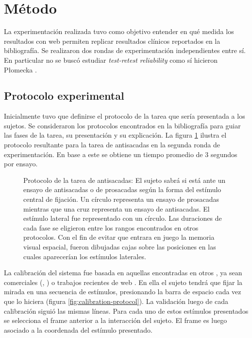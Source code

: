 \section{Método}

La experimentación realizada tuvo como objetivo entender en qué medida los
resultados con \eyetracking web permiten replicar resultados clínicos
reportados en la bibliografía.
Se realizaron dos rondas de experimentación independientes entre sí.
En particular no se buscó estudiar \textit{test-retest reliability} como sí
hicieron P{\l}omecka \etal \cite{plomecka_2020_retest_reliability}.

\subsection{Protocolo experimental}

  Inicialmente tuvo que definirse el protocolo de la tarea que sería presentada
  a los sujetos.
  Se consideraron los protocolos encontrados en la bibliografía
  \cite{munoz_2004_look_away, unsworth_2011_distribution_analysis,
  olincy_1997_age_diminishes_performance} para guiar las fases de la tarea, su
  presentación y su explicación.
  La figura \ref{fig:antisaccades-protocol} ilustra el protocolo resultante para
  la tarea de antisacadas en la segunda ronda de experimentación.
  En base a este se obtiene un tiempo promedio de 3 segundos por ensayo.

  \begin{figure}
    \centering
    \caption{Protocolo de la tarea de antisacadas: El sujeto sabrá si está ante un ensayo de antisacadas o de prosacadas según
    la forma del estímulo central de fijación.
    Un círculo representa un ensayo de prosacadas mientras que una cruz
    representa un ensayo de antisacadas.
    El estímulo lateral fue representado con un círculo.
    Las duraciones de cada fase se eligieron entre los rangos encontrados en
    otros protocolos.
    Con el fin de evitar que entrara en juego la memoria visual espacial,
    fueron dibujadas cajas sobre las posiciones en las cuales aparecerían los
    estímulos laterales.
}
    \label{fig:antisaccades-protocol}
  \end{figure}

  La calibración del sistema fue basada en aquellas encontradas en otros
  \eyetrackers, ya sean \eyetrackers comerciales (\tobii, \eyelink) o trabajos
  recientes de \eyetracking web \cite{xu_2015_turker_gaze,
  papoutsaki_2016_webgazer}.
  En ella el sujeto tendrá que fijar la mirada en una secuencia de estímulos,
  presionando la barra de espacio cada vez que lo hiciera (figura
  \ref{fig:calibration-protocol}).
  La validación luego de cada calibración siguió las mismas líneas.
  Para cada uno de estos estímulos presentados se selecciona el frame anterior a
  la interacción del sujeto.
  El frame es luego asociado a la coordenada del estímulo presentado.

